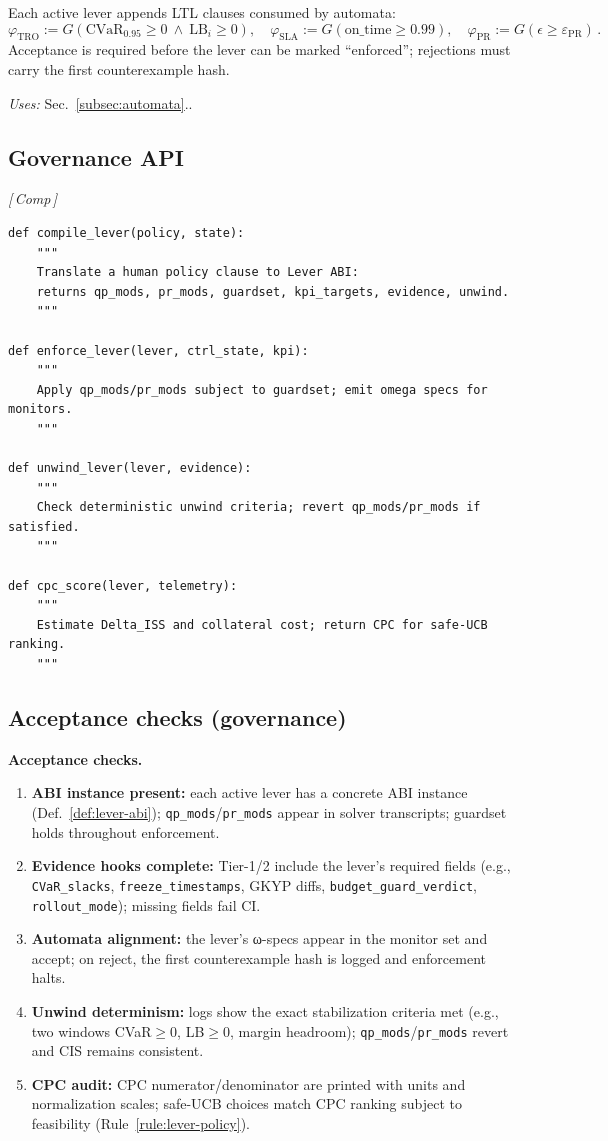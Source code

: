 \documentclass[10pt]{article}
\newcommand{\uses}[1]{\par\smallskip\noindent\textit{Uses: }#1.\par\smallskip}
\newcommand{\layertag}[1]{\textsf{\footnotesize[\,#1\,]}}
\newenvironment{acceptchecks}{\par\medskip\noindent\textbf{Acceptance checks.}\begin{enumerate}[leftmargin=*]}{\end{enumerate}\medskip}
\newenvironment{acceptchecks}{\begin{mdframed}\textbf{Acceptance checks.}\begin{enumerate}[leftmargin=*]}{\end{enumerate}\end{mdframed}}
\providecommand{\constsymPRmargin}{\varepsilon_{\mathrm{PR}}}
\begin{document}
Each active lever appends LTL clauses consumed by automata:
\[
\varphi_{\text{TRO}}:=G(\mathrm{CVaR}_{0.95}\!\ge0\ \wedge\ \mathrm{LB}_i\!\ge0),\quad
\varphi_{\text{SLA}}:=G(\text{on\_time}\!\ge\!0.99),\quad
\varphi_{\text{PR}}:=G(\epsilon\!\ge\!\constsymPRmargin)\,.
\]
Acceptance is required before the lever can be marked “enforced”; rejections must carry the first counterexample hash. \uses{Sec.~\ref{subsec:automata}.}

\subsection{Governance API}\label{subsec:gov-api}
\emph{\layertag{Comp}}
\begin{lstlisting}
def compile_lever(policy, state):
    """
    Translate a human policy clause to Lever ABI:
    returns qp_mods, pr_mods, guardset, kpi_targets, evidence, unwind.
    """

def enforce_lever(lever, ctrl_state, kpi):
    """
    Apply qp_mods/pr_mods subject to guardset; emit omega specs for monitors.
    """

def unwind_lever(lever, evidence):
    """
    Check deterministic unwind criteria; revert qp_mods/pr_mods if satisfied.
    """

def cpc_score(lever, telemetry):
    """
    Estimate Delta_ISS and collateral cost; return CPC for safe-UCB ranking.
    """
\end{lstlisting}

\subsection{Acceptance checks (governance)}\label{subsec:gov-accept}
\begin{acceptchecks}
\item \textbf{ABI instance present:} each active lever has a concrete ABI instance (Def.~\ref{def:lever-abi}); \texttt{qp\_mods}/\texttt{pr\_mods} appear in solver transcripts; guardset holds throughout enforcement.
\item \textbf{Evidence hooks complete:} Tier-1/2 include the lever’s required fields (e.g., \texttt{CVaR\_slacks}, \texttt{freeze\_timestamps}, GKYP diffs, \texttt{budget\_guard\_verdict}, \texttt{rollout\_mode}); missing fields fail CI.
\item \textbf{Automata alignment:} the lever’s ω-specs appear in the monitor set and accept; on reject, the first counterexample hash is logged and enforcement halts.
\item \textbf{Unwind determinism:} logs show the exact stabilization criteria met (e.g., two windows CVaR$\ge0$, LB$\ge0$, margin headroom); \texttt{qp\_mods}/\texttt{pr\_mods} revert and CIS remains consistent.
\item \textbf{CPC audit:} CPC numerator/denominator are printed with units and normalization scales; safe-UCB choices match CPC ranking subject to feasibility (Rule~\ref{rule:lever-policy}).
\end{acceptchecks}
\end{document}
